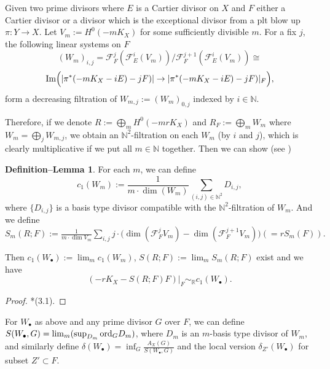 \documentclass[12pt,reqno]{amsart}%
\newcommand{\bN}{{\mathbb{N} }}
\newcommand{\bR}{{\mathbb{R} }}
\newcommand{\cF}{\mathcal{F}}
\newcommand{\ord}{{\rm ord}}
\theoremstyle{definition}
\newtheorem{defn-lem}[thm]{Definition--Lemma}  %
\theoremstyle{remark}
\begin{document}
Given two prime divisors where $E$ is a Cartier divisor on $X$ and $F$ either a Cartier divisor or a divisor which is the exceptional divisor from a plt blow up $\pi\colon Y\to X$. Let $V_m:=H^0(-mK_X)$ for some sufficiently divisible $m$. For a fix $j$, the following linear systems on $F$
$$(W_m)_{i,j}=\cF^j_F(\cF^i_E(V_m))/\cF_F^{j+1}(\cF^i_E(V_m))\cong $$
$${\rm Im}\Big( |\pi^*(-mK_X-iE)-jF)| \to  |\pi^*(-mK_X-iE)-jF)|_F\Big),$$
form a decreasing filtration of $W_{m,j}:=(W_m)_{0,j}$ indexed by $i\in \bN$.  

Therefore, if we denote $R:=\bigoplus_m H^0(-mrK_X)$ and $R_F:=\bigoplus_m W_m$ where $W_m=\bigoplus_j W_{m,j} $, we obtain an $\bN^2$-filtration on each $W_m$ (by $i$ and $j$), which is clearly multiplicative if we put all $m\in \bN$ together.   Then we can show (see \cite[Section 2]{AZ20})
\begin{defn-lem}For each $m$, we can define 
$$c_1(W_m):=\frac{1}{m\cdot \dim(W_m)}\sum_{(i,j)\in \bN^2}D_{i,j},$$ where $\{D_{i,j}\}$ is a basis type divisor compatible with the $\bN^2$-filtration of $W_m$. And we define $S_m(R;F):=\frac{1}{m\cdot \dim V_m}\sum_{i,j} j\cdot \big(\dim (\cF^j_FV_m)-\dim(\cF^{j+1}_FV_m)\big)(=rS_m(F)).$

Then  $c_1(W_{\bullet}):=\lim_m c_1(W_m)$, $S(R;F):=\lim_m S_m(R;F)$ exist and we have
$$ (-rK_X-S(R;F)F)|_F\sim_{\bR} c_1(W_{\bullet}).$$
\end{defn-lem}
\begin{proof}\cite{AZ20}*{(3.1)}.
\end{proof}
For $W_{\bullet}$ as above and any prime divisor $G$ over $F$, we can define $S(W_{\bullet},G)=\lim_m (\sup_{D_m} \ord_{G} D_m)$, where $D_m$ is an $m$-basis type divisor of $W_m$, and similarly define $\delta(W_{\bullet})=\inf_G \frac{A_{X}(G)}{S(W_{\bullet},G)}$ and the local version $\delta_{Z'}(W_{\bullet})$ for subset $Z'\subset F$.
\end{document}

